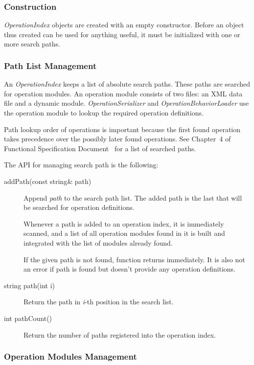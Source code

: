 \documentclass[a4paper,twoside]{tce}
\begin{document}
\subsubsection{Construction}
\emph{OperationIndex} objects are created with an empty constructor.  Before
an object thus created can be used for anything useful, it must be
initialized with one or more search paths.

\subsubsection{Path List Management}

An \emph{OperationIndex} keeps a list of absolute search paths.  These paths
are searched for operation modules.  An operation module consists of two
files: an XML data file and a dynamic module.  \emph{OperationSerializer}
and \emph{OperationBehaviorLoader} use the operation module to lookup the
required operation definitions.

Path lookup order of operations is important because the first found
operation takes precedence over the possibly later found operations. See
Chapter~4 of Functional Specification Document~\cite{OSAL-specs} for a list
of searched paths.

The API for managing search path is the following:
\begin{description}
\item[addPath(const string\& path)]%
  Append \emph{path} to the search path list.  The added path is the last
  that will be searched for operation definitions.

 Whenever a path is added to an operation index, it is immediately scanned,
 and a list of all operation modules found in it is built and integrated with
 the list of modules already found. 

 If the given path is not found, function returns immediately. It is
 also not an error if path is found but doesn't provide any operation 
 definitions.

\item[string path(int i)]%
  Return the path in \emph{i}-th position in the search list.
\item[int pathCount()]%
  Return the number of paths registered into the operation index.
\end{description}


\subsubsection{Operation Modules Management}
\end{document}
